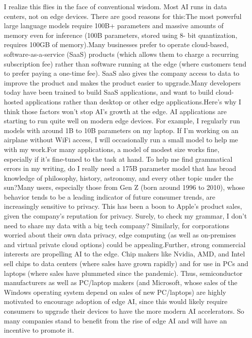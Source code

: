 \documentclass[withindex,glossary,firstyr]{cam-thesis}
\begin{document}
I realize this flies in the face of conventional wisdom. Most AI runs in data centers, not on edge devices. There are good reasons for this:The most powerful large language models require 100B+ parameters and massive amounts of memory even for inference (100B parameters, stored using 8- bit quantization, requires 100GB of memory).Many businesses prefer to operate cloud-based, software-as-a-service (SaaS) products (which allows them to charge a recurring subscription fee) rather than software running at the edge (where customers tend to prefer paying a one-time fee). SaaS also gives the company access to data to improve the product and makes the product easier to upgrade.Many developers today have been trained to build SaaS applications, and want to build cloud-hosted applications rather than desktop or other edge applications.Here’s why I think those factors won’t stop AI’s growth at the edge. AI applications are starting to run quite well on modern edge devices. For example, I regularly run models with around 1B to 10B parameters on my laptop. If I’m working on an airplane without WiFi access, I will occasionally run a small model to help me with my work.For many applications, a model of modest size works fine, especially if it’s fine-tuned to the task at hand. To help me find grammatical errors in my writing, do I really need a 175B parameter model that has broad knowledge of philosophy, history, astronomy, and every other topic under the sun?Many users, especially those from Gen Z (born around 1996 to 2010), whose behavior tends to be a leading indicator of future consumer trends, are increasingly sensitive to privacy. This has been a boon to Apple’s product sales, given the company’s reputation for privacy. Surely, to check my grammar, I don’t need to share my data with a big tech company? Similarly, for corporations worried about their own data privacy, edge computing (as well as on-premises and virtual private cloud options) could be appealing.Further, strong commercial interests are propelling AI to the edge. Chip makers like Nvidia, AMD, and Intel sell chips to data centers (where sales have grown rapidly) and for use in PCs and laptops (where sales have plummeted since the pandemic). Thus, semiconductor manufacturers as well as PC/laptop makers (and Microsoft, whose sales of the Windows operating system depend on sales of new PC/laptops) are highly motivated to encourage adoption of edge AI, since this would likely require consumers to upgrade their devices to have the more modern AI accelerators. So many companies stand to benefit from the rise of edge AI and will have an incentive to promote it.
\end{document}
